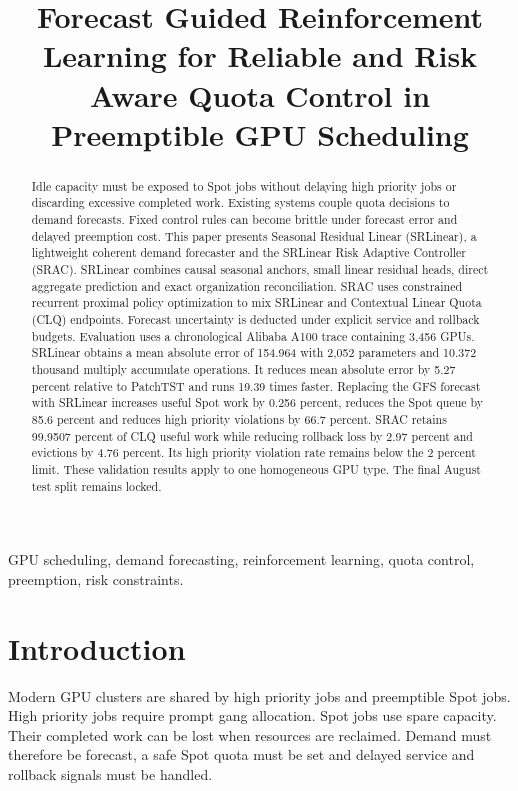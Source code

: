 \documentclass[conference]{IEEEtran}
\title{Forecast Guided Reinforcement Learning for Reliable and Risk Aware Quota Control in Preemptible GPU Scheduling}
\author{\IEEEauthorblockN{Anonymous Authors}}
\begin{document}
\maketitle

\begin{abstract}
Idle capacity must be exposed to Spot jobs without delaying high priority jobs or discarding excessive completed work. Existing systems couple quota decisions to demand forecasts. Fixed control rules can become brittle under forecast error and delayed preemption cost. This paper presents Seasonal Residual Linear (SRLinear), a lightweight coherent demand forecaster and the SRLinear Risk Adaptive Controller (SRAC). SRLinear combines causal seasonal anchors, small linear residual heads, direct aggregate prediction and exact organization reconciliation. SRAC uses constrained recurrent proximal policy optimization to mix SRLinear and Contextual Linear Quota (CLQ) endpoints. Forecast uncertainty is deducted under explicit service and rollback budgets. Evaluation uses a chronological Alibaba A100 trace containing 3,456 GPUs. SRLinear obtains a mean absolute error of 154.964 with 2,052 parameters and 10.372 thousand multiply accumulate operations. It reduces mean absolute error by 5.27 percent relative to PatchTST and runs 19.39 times faster. Replacing the GFS forecast with SRLinear increases useful Spot work by 0.256 percent, reduces the Spot queue by 85.6 percent and reduces high priority violations by 66.7 percent. SRAC retains 99.9507 percent of CLQ useful work while reducing rollback loss by 2.97 percent and evictions by 4.76 percent. Its high priority violation rate remains below the 2 percent limit. These validation results apply to one homogeneous GPU type. The final August test split remains locked.
\end{abstract}

\begin{IEEEkeywords}
GPU scheduling, demand forecasting, reinforcement learning, quota control, preemption, risk constraints.
\end{IEEEkeywords}

\section{Introduction}
Modern GPU clusters are shared by high priority jobs and preemptible Spot jobs. High priority jobs require prompt gang allocation. Spot jobs use spare capacity. Their completed work can be lost when resources are reclaimed. Demand must therefore be forecast, a safe Spot quota must be set and delayed service and rollback signals must be handled.
\end{document}
